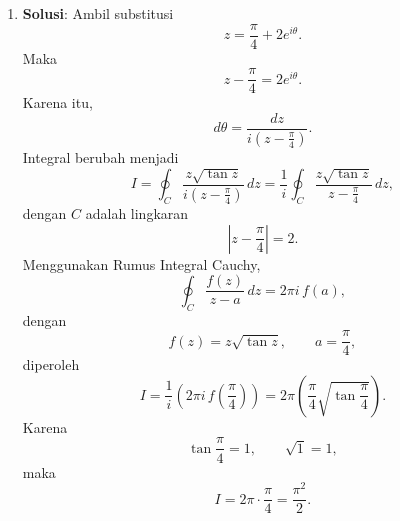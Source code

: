 \documentclass[11pt,letterpaper]{article}
\newcommand{\jawab}{\textbf{Solusi}:}
\begin{document}
\begin{enumerate}
\begin{enumerate}[label=\alph*)]
          \item \jawab
                Untuk deret
                \[
                  \sum_{k=0}^{\infty} e^k(z-2i)^k,
                \]
                tulis sebagai
                \[
                  \sum_{k=0}^{\infty} \bigl(e(z-2i)\bigr)^k.
                \]
                Ini adalah deret geometri dengan rasio
                \[
                  r=e(z-2i).
                \]
                Deret geometri konvergen jika dan hanya jika
                \[
                  |r|<1.
                \]
                Jadi
                \[
                  |e(z-2i)|<1
                  \iff
                  |z-2i|<\frac{1}{e}.
                \]
                Dengan demikian, daerah konvergensinya adalah
                \[
                  \{z\in\mathbb{C}: |z-2i|<\tfrac{1}{e}\},
                \]
                dengan jari-jari konvergensi
                \[
                  R=\frac{1}{e}.
                \]
        \end{enumerate}

  \item \jawab
        Ambil substitusi
        \[
          z = \frac{\pi}{4} + 2e^{i\theta}.
        \]
        Maka
        \[
          z - \frac{\pi}{4} = 2e^{i\theta}.
        \]
        Karena itu,
        \[
          d\theta = \frac{dz}{i\left(z-\frac{\pi}{4}\right)}.
        \]
        Integral berubah menjadi
        \[
          I
          =
          \oint_C
          \frac{z\sqrt{\tan z}}{i\left(z-\frac{\pi}{4}\right)}\,dz
          =
          \frac{1}{i}
          \oint_C
          \frac{z\sqrt{\tan z}}{z-\frac{\pi}{4}}\,dz,
        \]
        dengan $C$ adalah lingkaran
        \[
          \left|z-\frac{\pi}{4}\right|=2.
        \]
        Menggunakan Rumus Integral Cauchy,
        \[
          \oint_C \frac{f(z)}{z-a}\,dz = 2\pi i\,f(a),
        \]
        dengan
        \[
          f(z)=z\sqrt{\tan z},
          \qquad
          a=\frac{\pi}{4},
        \]
        diperoleh
        \[
          I
          =
          \frac{1}{i}
          \left(2\pi i\,f\left(\frac{\pi}{4}\right)\right)
          =
          2\pi \left(\frac{\pi}{4}\sqrt{\tan\frac{\pi}{4}}\right).
        \]
        Karena
        \[
          \tan\frac{\pi}{4}=1,
          \qquad
          \sqrt{1}=1,
        \]
        maka
        \[
          I = 2\pi \cdot \frac{\pi}{4} = \frac{\pi^2}{2}.
        \]
\end{enumerate}
\end{document}
